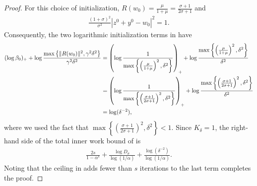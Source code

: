 \documentclass[11pt]{article}
\begin{document}
\begin{proof}
    For this choice of initialization, $R(w_0)=\frac{\mu}{1+\mu} = \frac{\sigma+1}{2\sigma+1}$ and
    \begin{align}
        \frac{(1+\sigma)^2}{\sigma^2}|z^0+y^0-w_0|^2=1.
    \end{align}
    Consequently, the two logarithmic initialization terms in  have 
    \begin{align}
         (\log\beta_0)_+  + \log\frac{\max\left\{ \lVert R(w_{0})\rVert^2,\gamma^2\delta^2 \right\}}{\gamma^2\delta^2} &= \left( \log\frac{1}{\max\left\{\left( \frac{\mu}{1+\mu} \right)^2, \delta^2\right\}} \right)_+ + \log\frac{\max\left\{ \left( \frac{\mu}{1+\mu} \right)^2,\delta^2 \right\}}{\delta^2} \\
        &= \left(\log \frac{1}{\max\left\{\left( \frac{\sigma+1}{2\sigma+1} \right)^2, \delta^2\right\}} \right)_+ + \log\frac{\max\left\{ \left( \frac{\sigma+1}{2\sigma+1} \right)^2,\delta^2 \right\}}{\delta^2}\\
        &=\log(\delta^{-2}),
    \end{align}
    where we used the fact that $\max\left\{\left( \frac{\sigma+1}{2\sigma+1} \right)^2, \delta^2\right\} < 1$.
    Since $K_\delta=1$, the right-hand side of the total inner work bound  of  is
    \begin{align}
        \frac{2s}{1-\alpha^s}+\frac{ \log D_{\sigma} }{\log(1/\alpha)}
        +\frac{\log(\delta^{-2})}{\log(1/\alpha)}.
    \end{align}
    Noting that the ceiling in  adds fewer than $s$ iterations to the last term completes the proof.
\end{proof}
\end{document}
